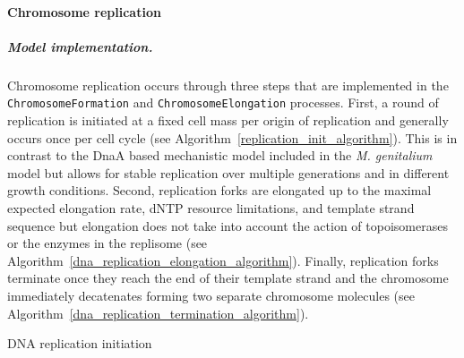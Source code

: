 \documentclass[12pt]{article}
\begin{document}
\baselineskip24pt

\paragraph{Chromosome replication}
\label{sec:chrom-rep}

\subparagraph{Model implementation.}
Chromosome replication occurs through three steps that are implemented in the \texttt{ChromosomeFormation} and \texttt{ChromosomeElongation} processes. First, a round of replication is initiated at a fixed cell mass per origin of replication and generally occurs once per cell cycle (see Algorithm~\ref{replication_init_algorithm}). This is in contrast to the DnaA based mechanistic model included in the \textit{M. genitalium} model but allows for stable replication over multiple generations and in different growth conditions. Second, replication forks are elongated up to the maximal expected elongation rate, dNTP resource limitations, and template strand sequence but elongation does not take into account the action of topoisomerases or the enzymes in the replisome (see Algorithm~\ref{dna_replication_elongation_algorithm}). Finally, replication forks terminate once they reach the end of their template strand and the chromosome immediately decatenates forming two separate chromosome molecules  (see Algorithm~\ref{dna_replication_termination_algorithm}).\\


\begin{algorithm}[H]
\caption{DNA replication initiation}
\label{replication_init_algorithm}



\end{algorithm}
\end{document}
